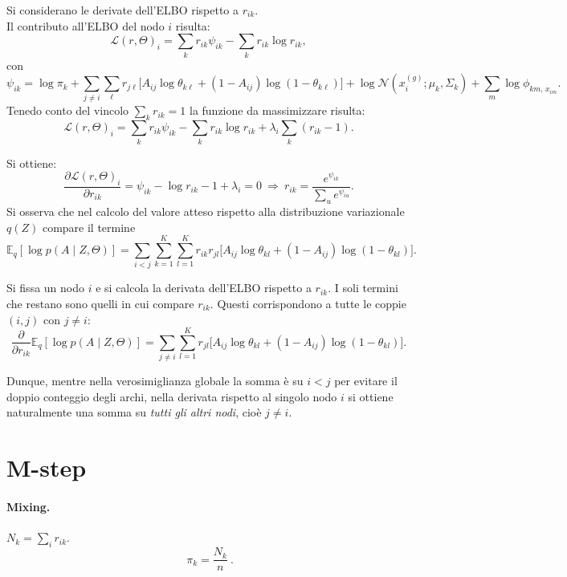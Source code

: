 \documentclass[11pt,a4paper]{article}
\begin{document}

Si considerano le derivate dell'ELBO rispetto a $r_{ik}$. \\
Il contributo all'ELBO del nodo $i$ risulta:
\[
\mathcal{L}(r,\Theta)_i=\sum_k r_{ik}\psi_{ik}-\sum_k r_{ik}\log r_{ik},
\]
con
\[
\psi_{ik}=\log \pi_k+\sum_{j\ne i}\sum_\ell r_{j\ell}\big[A_{ij}\log\theta_{k\ell}+(1-A_{ij})\log(1-\theta_{k\ell})\big]
+\log \mathcal{N}(x_i^{(g)};\mu_k,\Sigma_k)+\sum_m \log \phi_{k m,\,x_{im}}.\]
Tenedo conto del vincolo $\sum_k r_{ik}=1$ la funzione da massimizzare risulta:
\[
\mathcal{L}(r,\Theta)_i=\sum_k r_{ik}\psi_{ik}-\sum_k r_{ik}\log r_{ik} +\lambda_i\sum_k (r_{ik}-1).
\]

Si ottiene:
\[
\frac{\partial \mathcal{L}(r,\Theta)_i}{\partial r_{ik}}=\psi_{ik}-\log r_{ik}-1+\lambda_i=0
\ \Rightarrow\
r_{ik}=\frac{e^{\psi_{ik}}}{\sum_u e^{\psi_{iu}}}.
\]
Si osserva che nel calcolo del valore atteso rispetto alla distribuzione variazionale $q(Z)$
compare il termine
\[
\mathbb{E}_q[\log p(A \mid Z, \Theta)]
= \sum_{i < j} 
\sum_{k=1}^K \sum_{l=1}^K
r_{ik} r_{jl} \Big[ A_{ij} \log \theta_{kl} + (1-A_{ij}) \log (1-\theta_{kl}) \Big].
\]

Si fissa un nodo $i$ e si calcola la derivata dell'ELBO rispetto a $r_{ik}$.
I soli termini che restano sono quelli in cui compare $r_{ik}$.
Questi corrispondono a tutte le coppie $(i,j)$ con $j \neq i$:
\[
\frac{\partial}{\partial r_{ik}}
\mathbb{E}_q[\log p(A \mid Z, \Theta)]
= \sum_{j \neq i} \sum_{l=1}^K
r_{jl} \Big[ A_{ij} \log \theta_{kl} + (1-A_{ij}) \log (1-\theta_{kl}) \Big].
\]

Dunque, mentre nella verosimiglianza globale la somma è su $i<j$ per evitare
il doppio conteggio degli archi, nella derivata rispetto al singolo nodo $i$
si ottiene naturalmente una somma su \emph{tutti gli altri nodi}, cioè $j \neq i$.



\section{M-step}
\paragraph{Mixing.} $N_k=\sum_i r_{ik}$.
\[
\ \pi_k=\frac{N_k}{n}\ .
\]
\end{document}
